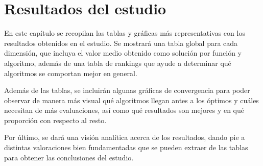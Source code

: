 \chapter{Resultados del estudio}

En este capítulo se recopilan las tablas y gráficas más representativas con los resultados obtenidos en el estudio. Se mostrará una tabla global para cada dimensión, que incluya el valor medio obtenido como solución por función y algoritmo, además de una tabla de rankings que ayude a determinar qué algoritmos se comportan mejor en general.

Además de las tablas, se incluirán algunas gráficas de convergencia para poder observar de manera más visual qué algoritmos llegan antes a los óptimos y cuáles necesitan de más evaluaciones, así como qué resultados son mejores y en qué proporción con respecto al resto.

Por último, se dará una visión analítica acerca de los resultados, dando pie a distintas valoraciones bien fundamentadas que se pueden extraer de las tablas para obtener las conclusiones del estudio.

